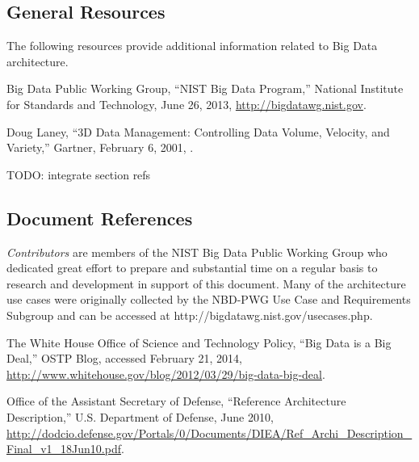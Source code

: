 \documentclass[11pt]{article}
\begin{document}
\subsection{General Resources}

The following resources provide additional information related to Big Data architecture. 

Big Data Public Working Group, “NIST Big Data Program,” National Institute for Standards and 
Technology, June 26, 2013, \url{http://bigdatawg.nist.gov}.

Doug Laney, “3D Data Management: Controlling Data Volume, Velocity, and Variety,” Gartner, February 
6, 2001, \cite{laney013ddata}.

TODO: integrate section refs

\subsection{Document References}

 {\it Contributors} are members of the NIST Big Data Public Working Group who dedicated great effort to prepare 
and substantial time on a regular basis to research and development in support of this document.
  Many of the architecture use cases were originally collected by the NBD-PWG Use Case and Requirements 
Subgroup and can be accessed at http://bigdatawg.nist.gov/usecases.php.

The White House Office of Science and Technology Policy, “Big Data is a Big Deal,” OSTP Blog, accessed 
February 21, 2014, \url{http://www.whitehouse.gov/blog/2012/03/29/big-data-big-deal}.
 
Office of the Assistant Secretary of Defense, “Reference Architecture Description,” U.S. Department of Defense, 
June 2010, \url{http://dodcio.defense.gov/Portals/0/Documents/DIEA/Ref_Archi_Description_Final_v1_18Jun10.pdf}.




 
\end{document}
